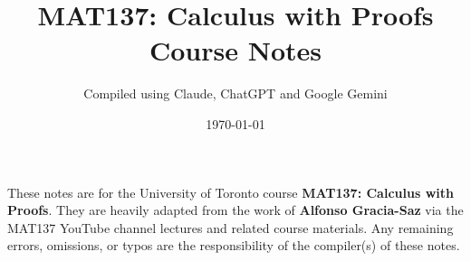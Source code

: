 \documentclass[12pt]{book}
\begin{document}
\title{MAT137: Calculus with Proofs\\Course Notes}
\author{Compiled using Claude, ChatGPT and Google Gemini}
\date{\today}
\maketitle

\begin{center}
\begin{minipage}{0.85\textwidth}
\small
These notes are for the University of Toronto course \textbf{MAT137: Calculus with Proofs}.
They are heavily adapted from the work of \textbf{Alfonso Gracia-Saz} via the MAT137 YouTube channel lectures and related course materials.
Any remaining errors, omissions, or typos are the responsibility of the compiler(s) of these notes.
\end{minipage}
\end{center}

\clearpage

\tableofcontents
















\appendix

\end{document}
